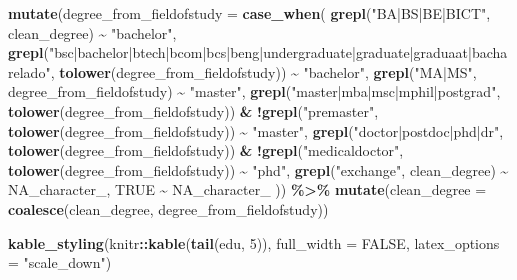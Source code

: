 \documentclass[11pt,]{article}
\newenvironment{Shaded}{\begin{snugshade}}{\end{snugshade}}
\newcommand{\AttributeTok}[1]{\textcolor[rgb]{0.13,0.29,0.53}{#1}}
\newcommand{\ConstantTok}[1]{\textcolor[rgb]{0.56,0.35,0.01}{#1}}
\newcommand{\DecValTok}[1]{\textcolor[rgb]{0.00,0.00,0.81}{#1}}
\newcommand{\FunctionTok}[1]{\textcolor[rgb]{0.13,0.29,0.53}{\textbf{#1}}}
\newcommand{\NormalTok}[1]{#1}
\newcommand{\SpecialCharTok}[1]{\textcolor[rgb]{0.81,0.36,0.00}{\textbf{#1}}}
\newcommand{\StringTok}[1]{\textcolor[rgb]{0.31,0.60,0.02}{#1}}
\begin{document}
\begin{Shaded}
\begin{Highlighting}[]
  \FunctionTok{mutate}\NormalTok{(}\AttributeTok{degree\_from\_fieldofstudy =} \FunctionTok{case\_when}\NormalTok{(}
    \FunctionTok{grepl}\NormalTok{(}\StringTok{"BA|BS|BE|BICT"}\NormalTok{, clean\_degree) }\SpecialCharTok{\textasciitilde{}} \StringTok{"bachelor"}\NormalTok{,}
    \FunctionTok{grepl}\NormalTok{(}\StringTok{"bsc|bachelor|btech|bcom|bcs|beng|undergraduate|graduate|graduaat|bacharelado"}\NormalTok{, }
          \FunctionTok{tolower}\NormalTok{(degree\_from\_fieldofstudy)) }\SpecialCharTok{\textasciitilde{}} \StringTok{"bachelor"}\NormalTok{,}
    \FunctionTok{grepl}\NormalTok{(}\StringTok{"MA|MS"}\NormalTok{, degree\_from\_fieldofstudy) }\SpecialCharTok{\textasciitilde{}} \StringTok{"master"}\NormalTok{,}
    \FunctionTok{grepl}\NormalTok{(}\StringTok{"master|mba|msc|mphil|postgrad"}\NormalTok{, }\FunctionTok{tolower}\NormalTok{(degree\_from\_fieldofstudy)) }\SpecialCharTok{\&} 
      \SpecialCharTok{!}\FunctionTok{grepl}\NormalTok{(}\StringTok{"premaster"}\NormalTok{, }\FunctionTok{tolower}\NormalTok{(degree\_from\_fieldofstudy)) }\SpecialCharTok{\textasciitilde{}} \StringTok{"master"}\NormalTok{,}
    \FunctionTok{grepl}\NormalTok{(}\StringTok{"doctor|postdoc|phd|dr"}\NormalTok{, }\FunctionTok{tolower}\NormalTok{(degree\_from\_fieldofstudy)) }\SpecialCharTok{\&} 
      \SpecialCharTok{!}\FunctionTok{grepl}\NormalTok{(}\StringTok{"medicaldoctor"}\NormalTok{, }\FunctionTok{tolower}\NormalTok{(degree\_from\_fieldofstudy)) }\SpecialCharTok{\textasciitilde{}} \StringTok{"phd"}\NormalTok{,}
    \FunctionTok{grepl}\NormalTok{(}\StringTok{"exchange"}\NormalTok{, clean\_degree) }\SpecialCharTok{\textasciitilde{}} \ConstantTok{NA\_character\_}\NormalTok{,}
    \ConstantTok{TRUE} \SpecialCharTok{\textasciitilde{}} \ConstantTok{NA\_character\_}
\NormalTok{  )) }\SpecialCharTok{\%\textgreater{}\%} 
  \FunctionTok{mutate}\NormalTok{(}\AttributeTok{clean\_degree =} \FunctionTok{coalesce}\NormalTok{(clean\_degree, degree\_from\_fieldofstudy))}

\FunctionTok{kable\_styling}\NormalTok{(knitr}\SpecialCharTok{::}\FunctionTok{kable}\NormalTok{(}\FunctionTok{tail}\NormalTok{(edu, }\DecValTok{5}\NormalTok{)), }\AttributeTok{full\_width =} \ConstantTok{FALSE}\NormalTok{, }
              \AttributeTok{latex\_options =} \StringTok{"scale\_down"}\NormalTok{)}
\end{Highlighting}
\end{Shaded}
\end{document}
